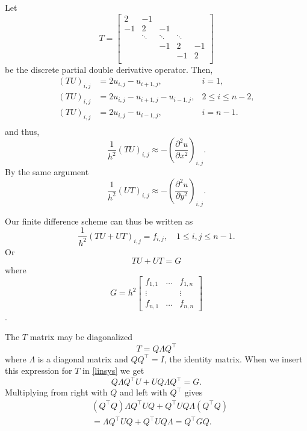 \documentclass{article}
\begin{document}
Let 
\begin{equation}
       T = \begin{bmatrix}
               2 & -1 & & & \\
               -1 & 2 & -1 & & \\
               & \ddots & \ddots & \ddots &\\
               & & -1 & 2 & -1\\
               & & & -1 & 2 \\
       \end{bmatrix}
\end{equation}
be the discrete partial double derivative operator.
Then,
\begin{align*}
       (TU)_{i,j} &= 2u_{i,j} - u_{i+1,j}, &i=1,\\
       (TU)_{i,j} &= 2u_{i,j} - u_{i+1,j} - u_{i-1,j}, &2 \leq i \leq n-2,\\
       (TU)_{i,j} &= 2u_{i,j} - u_{i-1,j}, &i=n-1.\\
\end{align*}
and thus,
\[
\frac{1}{h^2}(TU)_{i,j} \approx - \left(\frac{\partial^2 u}{\partial x^2}\right)_{i,j}.
\]
By the same argument
\[
\frac{1}{h^2}(UT)_{i,j} \approx - \left(\frac{\partial^2 u}{\partial y^2}\right)_{i,j}.
\]

Our finite difference scheme can thus be written as
\[
\frac{1}{h^2}(TU + UT)_{i,j} = f_{i,j}, \quad 1\leq i,j \leq n-1.
\]
Or
\[
\label{linsys}
TU + UT = G
\]
where
\begin{equation}
G = h^2 \begin{bmatrix}
               f_{1,1} & \dots & f_{1,n} \\
               \vdots  &       & \vdots \\
               f_{n,1} & \dots & f_{n,n}
       \end{bmatrix}
\end{equation}.

The $T$ matrix may be diagonalized
\[
T = Q \Lambda Q^\top
\]
where $\Lambda$ is a diagonal matrix and $Q Q^\top=I$, the identity matrix.
When we insert this expression for $T$ in \eqref{linsys} we get
\[
Q \Lambda Q^\top U + U Q \Lambda Q^\top = G.
\]
Multiplying from right with $Q$ and left with $Q^\top$ gives
\begin{align*}
&(Q^\top Q) \Lambda Q^\top U Q + Q^\top U Q \Lambda (Q^\top Q)\\
&= \Lambda Q^\top U Q + Q^\top U Q \Lambda = Q^\top G Q.
\end{align*}
\end{document}
